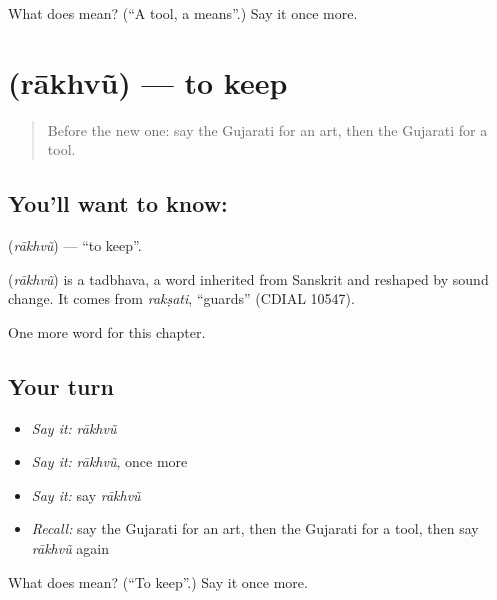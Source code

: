 \begin{tcolorbox}[breakable,colback=teal!4,colframe=teal!35!black,title={Before you move on}]
What does  mean? (\textquotedblleft{}A tool, a means\textquotedblright{}.) Say it once more.
\end{tcolorbox}
\section[\texorpdfstring{\gu{રાખવું} (rākhvũ)}{રાખવું (rākhvũ)}]{ (rākhvũ) — to keep}

\label{lesson:GU-C105-rakhvu}



\begin{quote}
Before the new one: say the Gujarati for an art, then the Gujarati for a tool.
\end{quote}

\subsection*{You'll want to know: }
\textbf{} (\emph{rākhvũ}) — \textquotedblleft{}to keep\textquotedblright{}.

\begin{cousinweb}
\textbf{} (\emph{rākhvũ}) is a tadbhava, a word inherited from Sanskrit and reshaped by sound change. It comes from \emph{rakṣati}, \textquotedblleft{}guards\textquotedblright{} (CDIAL 10547).
\end{cousinweb}

\begin{grammarlens}[title={What you've built}]
One more word for this chapter.
\end{grammarlens}

\subsection*{Your turn}
\begin{itemize}
\raggedright
  \item \emph{Say it:} \emph{rākhvũ}
  \item \emph{Say it:} \emph{rākhvũ}, once more
  \item \emph{Say it:} say \emph{rākhvũ}
  \item \emph{Recall:} say the Gujarati for an art, then the Gujarati for a tool, then say \emph{rākhvũ} again
\end{itemize}

\begin{tcolorbox}[breakable,colback=teal!4,colframe=teal!35!black,title={Before you move on}]
What does  mean? (\textquotedblleft{}To keep\textquotedblright{}.) Say it once more.
\end{tcolorbox}
